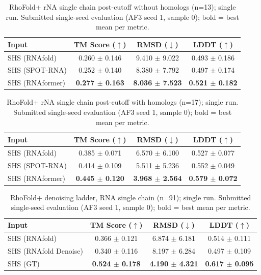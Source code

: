 \begin{table}[htbp]
\centering
\caption{RhoFold+ rNA single chain post-cutoff without homologs (n=13); single run. Submitted single-seed evaluation (AF3 seed 1, sample 0); bold = best mean per metric.}
\label{tab:rf_rna_single_chain_post_cutoff_without_homologs}
\begin{tabular}{lccc}
\toprule
Input & TM Score ($\uparrow$) & RMSD ($\downarrow$) & LDDT ($\uparrow$) \\
\midrule
SHS (RNAfold) & 0.260 $\pm$ 0.146 & 9.410 $\pm$ 9.022 & 0.493 $\pm$ 0.186 \\
SHS (SPOT-RNA) & 0.252 $\pm$ 0.140 & 8.380 $\pm$ 7.792 & 0.497 $\pm$ 0.174 \\
SHS (RNAformer) & \textbf{0.277 $\pm$ 0.163} & \textbf{8.036 $\pm$ 7.523} & \textbf{0.521 $\pm$ 0.182} \\
\bottomrule
\end{tabular}
\end{table}

\begin{table}[htbp]
\centering
\caption{RhoFold+ rNA single chain post-cutoff with homologs (n=17); single run. Submitted single-seed evaluation (AF3 seed 1, sample 0); bold = best mean per metric.}
\label{tab:rf_rna_single_chain_post_cutoff_with_homologs}
\begin{tabular}{lccc}
\toprule
Input & TM Score ($\uparrow$) & RMSD ($\downarrow$) & LDDT ($\uparrow$) \\
\midrule
SHS (RNAfold) & 0.385 $\pm$ 0.071 & 6.570 $\pm$ 6.100 & 0.527 $\pm$ 0.077 \\
SHS (SPOT-RNA) & 0.414 $\pm$ 0.109 & 5.511 $\pm$ 5.236 & 0.552 $\pm$ 0.049 \\
SHS (RNAformer) & \textbf{0.445 $\pm$ 0.120} & \textbf{3.968 $\pm$ 2.564} & \textbf{0.579 $\pm$ 0.072} \\
\bottomrule
\end{tabular}
\end{table}

\begin{table}[htbp]
\centering
\caption{RhoFold+ denoising ladder, RNA single chain (n=91); single run. Submitted single-seed evaluation (AF3 seed 1, sample 0); bold = best mean per metric.}
\label{tab:denoise_main_rf}
\begin{tabular}{lccc}
\toprule
Input & TM Score ($\uparrow$) & RMSD ($\downarrow$) & LDDT ($\uparrow$) \\
\midrule
SHS (RNAfold) & 0.366 $\pm$ 0.121 & 6.874 $\pm$ 6.181 & 0.514 $\pm$ 0.111 \\
SHS (RNAfold Denoise) & 0.340 $\pm$ 0.116 & 8.197 $\pm$ 6.284 & 0.497 $\pm$ 0.109 \\
SHS (GT) & \textbf{0.524 $\pm$ 0.178} & \textbf{4.190 $\pm$ 4.321} & \textbf{0.617 $\pm$ 0.095} \\
\bottomrule
\end{tabular}
\end{table}

